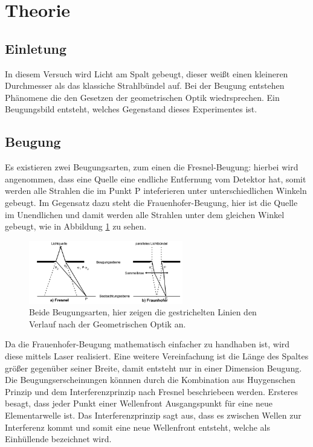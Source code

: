 \section{Theorie}
\label{sec:Theorie}

\subsection{Einletung}
In diesem Versuch wird Licht am Spalt gebeugt, dieser weißt einen kleineren Durchmesser als das klassiche
Strahlbündel auf. Bei der Beugung entstehen Phänomene die den Gesetzen der geometrischen Optik wiedrsprechen.
Ein Beugungsbild entsteht, welches Gegenstand dieses Experimentes ist.

\subsection{Beugung}
Es existieren zwei Beugungsarten, zum einen die Fresnel-Beugung: hierbei wird angenommen, dass eine
Quelle eine endliche Entfernung vom Detektor hat, somit werden alle Strahlen die im Punkt P inteferieren
unter unterschiedlichen Winkeln gebeugt. Im Gegensatz dazu steht die Frauenhofer-Beugung, hier ist
die Quelle im Unendlichen und damit werden alle Strahlen unter dem gleichen Winkel gebeugt, wie in Abbildung
\ref{fig:BA} zu sehen.
 \begin{figure}
  \centering
  \includegraphics[width=0.6\textwidth]{BA.PNG}
  \caption{Beide Beugungsarten, hier zeigen die gestrichelten Linien den Verlauf nach der Geometrischen Optik an.}
  \label{fig:BA}
\end{figure}
Da die Frauenhofer-Beugung mathematisch einfacher zu handhaben ist, wird diese mittels Laser realisiert.
Eine weitere Vereinfachung ist die Länge des Spaltes größer gegenüber seiner Breite, damit entsteht nur
in einer Dimension Beugung.
Die Beugungserscheinungen könnnen durch die Kombination aus Huygenschen Prinzip und dem Interferenzprinzip nach Fresnel beschriebeen werden.
Ersteres besagt, dass jeder Punkt einer Wellenfront Ausgangspunkt für eine neue Elementarwelle ist.
Das Interferenzprinzip sagt aus, dass es zwischen Wellen zur Interferenz kommt und somit eine neue Wellenfront
entsteht, welche als Einhüllende bezeichnet wird.
